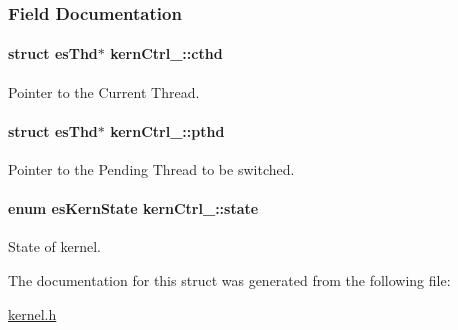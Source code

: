 \subsubsection{Field Documentation}
\hypertarget{structkernCtrl___ada8492a441474dd8243f9b3d6440b931}{
\paragraph[{cthd}]{\setlength{\rightskip}{0pt plus 5cm}struct {\bf es\-Thd}$\ast$ kern\-Ctrl\-\_\-\-::cthd}}\label{structkernCtrl___ada8492a441474dd8243f9b3d6440b931}


Pointer to the Current Thread. 

\hypertarget{structkernCtrl___aba053a184d6eedce8df1788a0ca5955e}{
\paragraph[{pthd}]{\setlength{\rightskip}{0pt plus 5cm}struct {\bf es\-Thd}$\ast$ kern\-Ctrl\-\_\-\-::pthd}}\label{structkernCtrl___aba053a184d6eedce8df1788a0ca5955e}


Pointer to the Pending Thread to be switched. 

\hypertarget{structkernCtrl___af9186609ce09f0a53278e95ccd5c36ec}{
\paragraph[{state}]{\setlength{\rightskip}{0pt plus 5cm}enum {\bf es\-Kern\-State} kern\-Ctrl\-\_\-\-::state}}\label{structkernCtrl___af9186609ce09f0a53278e95ccd5c36ec}


State of kernel. 



The documentation for this struct was generated from the following file\-:\begin{DoxyCompactItemize}
\item 
\hyperlink{kernel_8h}{kernel.\-h}\end{DoxyCompactItemize}
